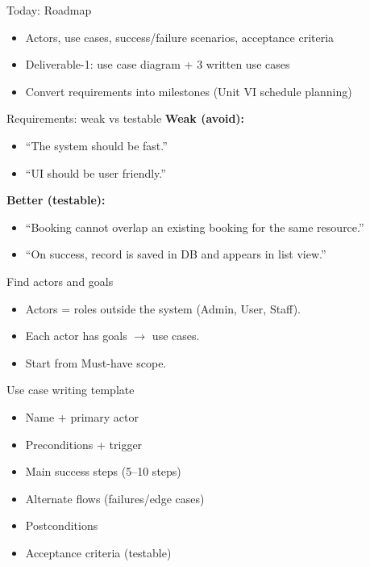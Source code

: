 \documentclass{beamer}
\begin{document}
\begin{frame}{Today: Roadmap}
  \begin{itemize}[<+->]
    \item Actors, use cases, success/failure scenarios, acceptance criteria
    \item Deliverable-1: use case diagram + 3 written use cases
    \item Convert requirements into milestones (Unit VI schedule planning)
  \end{itemize}
  \slidesources{\OOPSUnitVISources}
\end{frame}

\begin{frame}{Requirements: weak vs testable}
  \textbf{Weak (avoid):}
  \begin{itemize}
    \item ``The system should be fast.''
    \item ``UI should be user friendly.''
  \end{itemize}
  \vspace{0.4em}
  \textbf{Better (testable):}
  \begin{itemize}
    \item ``Booking cannot overlap an existing booking for the same resource.''
    \item ``On success, record is saved in DB and appears in list view.''
  \end{itemize}
  \slidesources{\OOPSUnitVISources}
\end{frame}

\begin{frame}{Find actors and goals}
  \begin{itemize}[<+->]
    \item Actors = roles outside the system (Admin, User, Staff).
    \item Each actor has goals $\rightarrow$ use cases.
    \item Start from Must-have scope.
  \end{itemize}
  \slidesources{\OOPSUnitVISources}
\end{frame}

\begin{frame}{Use case writing template}
  \begin{itemize}[<+->]
    \item Name + primary actor
    \item Preconditions + trigger
    \item Main success steps (5--10 steps)
    \item Alternate flows (failures/edge cases)
    \item Postconditions
    \item Acceptance criteria (testable)
  \end{itemize}
  \slidesources{\OOPSUnitVISources}
\end{frame}
\end{document}
